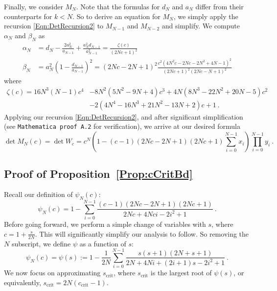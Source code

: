 \documentclass[11pt]{article}
\numberwithin{equation}{section}
\theoremstyle{definition}
\theoremstyle{definition}
\theoremstyle{definition}
\newcommand{\1}{\mathbf{1}}
\newcommand{\cCrit}{c_\mathrm{crit}}
\newcommand{\detDenom}[1]{2N{#1}+4N{#1}i-2i^2+1}
\newcommand{\psiNum}[1]{({#1}-1)(2N{#1}-2N+1)(2N{#1}+1)}
\newcommand{\subVar}{s}
\newcommand{\subVarCrit}{\subVar_{\text{crit}}}
\begin{document}
    Finally, we consider $M_N$. Note that the formulas for $d_N$ and $a_N$ differ from their counterparts for $k<N$. So to derive an equation for $M_N$, we simply apply the recursion \eqref{Eqn:DetRecursion2} to $M_{N-1}$ and $M_{N-2}$ and simplify. 
    We compute $\alpha_N$ and $\beta_N$ as
    \begin{align*}
    \alpha_N &= d_N - \frac{2a_N^2}{a_{N-1}}+\frac{a_N^2 d_{N-1}}{a_{N-1}^2}
    = \frac{\zeta(c)}{(2Nc+1)^2} \\
    \beta_N &= a_N^2\left(1-\frac{d_{N-1}}{a_{N-1}}\right)^2 
     = \left(2Nc-2N+1\right)^2\frac{c^2\left(4N^2c-2Nc-2N^2 +4N- 1\right)^2}{(2Nc+1)^2 (2Nc-N+1)^2}
    \end{align*}
    where
    \begin{align*}
    \zeta(c) = 16N^3(N-1)c^4 &-8N^2(5N^2-9N+4)c^3+4N(8N^3-22N^2+20N-5)c^2 \\
    &-2(4N^4-16N^3+21N^2-13N+2)c+1 \ .
    \end{align*}
    Applying our recursion \eqref{Eqn:DetRecursion2}, and after significant simplification (see \texttt{Mathematica proof A.2} for verification), we arrive at our desired formula
    \begin{equation*}
    \det M_N(c) = \det W_c = c^N\left(1 - \psiNum{c}\sum_{i=0}^{N-1} x_i \right) \prod_{i=0}^{N-1} y_i \ .
    \end{equation*}


\subsection{Proof of Proposition~\ref{Prop:cCritBd}} \label{App:ProofOfCBound}
Recall our definition of $\psi_N(c)$:
\begin{equation*} 
    \psi_N(c) = 1 - \sum_{i=0}^{N-1} \frac{\psiNum{c}} {\detDenom{c}} \ .
\end{equation*}
Before going forward, we perform a simple change of variables with $\subVar$, where $c=1+\frac{\subVar}{2N}$. This will significantly simplify our analysis to follow. So removing the $N$ subscript, we define $\psi$ as a function of $s$:
\begin{equation}\label{Eqn:psiSubVar}
    \psi_N(c) = \psi(\subVar) := 1 - \frac{1}{2N}\sum_{i=0}^{N-1} \frac{\subVar(\subVar+1)(2N+\subVar+1)}{2N+4Ni+(2i+1)\subVar-2i^2+1} \ .
\end{equation}
We now focus on approximating $\subVarCrit$, where $\subVarCrit$ is the largest root of $\psi(\subVar)$, or equivalently, $\subVarCrit = 2N(\cCrit - 1)$.
\end{document}
